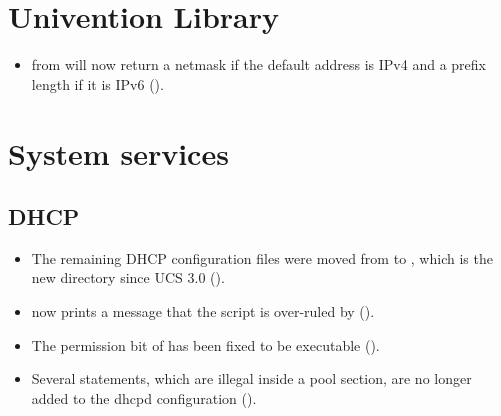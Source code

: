 \section{Univention Library}
\begin{itemize}
\item {} from  will now return a
  netmask if the default address is IPv4 and a prefix length if it is IPv6
  ().
\end{itemize}


\section{System services}

\subsection{DHCP}
\begin{itemize}
\item The remaining DHCP configuration files were moved from
   to , which is the new
  directory since UCS 3.0 ().

\item {} now prints a message that
  the script is over-ruled by 
  ().

\item The permission bit of  has been
  fixed to be executable ().

\item Several statements, which are illegal inside a pool section, are
  no longer added to the dhcpd configuration ().
\end{itemize}

